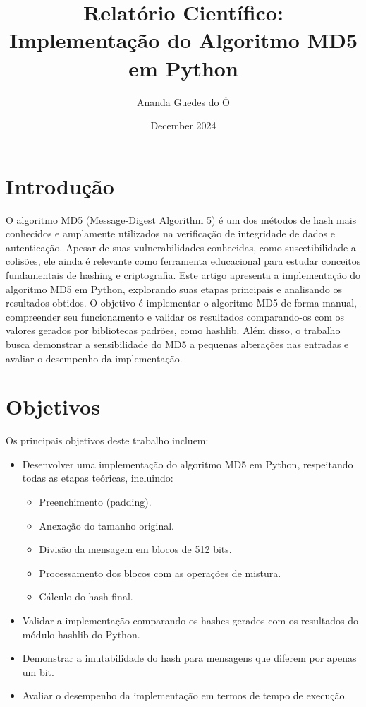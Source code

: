 \documentclass{article}
\title{Relatório Científico: Implementação do Algoritmo MD5 em Python}
\author{Ananda Guedes do Ó}
\date{December 2024}
\begin{document}
\maketitle

\section{Introdução}
O algoritmo MD5 (Message-Digest Algorithm 5) é um dos métodos de hash mais conhecidos e amplamente utilizados na verificação de integridade de dados e autenticação. Apesar de suas vulnerabilidades conhecidas, como suscetibilidade a colisões, ele ainda é relevante como ferramenta educacional para estudar conceitos fundamentais de hashing e criptografia. Este artigo apresenta a implementação do algoritmo MD5 em Python, explorando suas etapas principais e analisando os resultados obtidos. O objetivo é implementar o algoritmo MD5 de forma manual, compreender seu funcionamento e validar os resultados comparando-os com os valores gerados por bibliotecas padrões, como hashlib. Além disso, o trabalho busca demonstrar a sensibilidade do MD5 a pequenas alterações nas entradas e avaliar o desempenho da implementação.

\section{Objetivos}
Os principais objetivos deste trabalho incluem:
\begin{itemize}
    \item Desenvolver uma implementação do algoritmo MD5 em Python, respeitando todas as etapas teóricas, incluindo:
    \begin{itemize}
        \item Preenchimento (padding).
        \item Anexação do tamanho original.
        \item Divisão da mensagem em blocos de 512 bits.
        \item Processamento dos blocos com as operações de mistura.
        \item Cálculo do hash final.
    \end{itemize}
    \item Validar a implementação comparando os hashes gerados com os resultados do módulo hashlib do Python.
    \item Demonstrar a imutabilidade do hash para mensagens que diferem por apenas um bit.
    \item Avaliar o desempenho da implementação em termos de tempo de execução.
\end{itemize}
\end{document}

